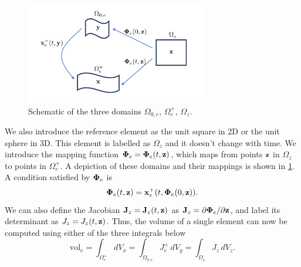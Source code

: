 \documentclass[11pt]{article}
\begin{document}
\begin{figure}[ht]
    \centering
    \includegraphics[width=0.7\textwidth]{../../images/three_spaces.pdf}
    \caption{Schematic of the three domains $\Omega_{0,e}$, $\Omega^+_e$, $\Omega_z$.}
    \label{fig:three_spaces}
 \end{figure}
We also introduce the reference element as the unit square in 2D or the unit sphere in 3D. This element is labelled as $\Omega_z$ and it doesn't change with time. We introduce the mapping function $\bm \Phi_e = \bm \Phi_e(t,\mathbf{z})$, which maps from points $\mathbf{z}$ in $\Omega_z$ to points in $\Omega^+_e$. A depiction of these domains and their mappings is shown in \cref{fig:three_spaces}. A condition satisfied by $\bm \Phi_e$ is
\begin{equation}
    \bm \Phi_e(t,\mathbf{z}) = \mathbf{x}^+_e(t, \bm \Phi_e(0,\mathbf{z})).
\end{equation}
We can also define the Jacobian $\mathbf{J}_z = \mathbf{J}_z(t,\mathbf{z})$ as $\mathbf{J}_z = \partial \bm \Phi_e / \partial \mathbf{z}$, and label its determinant as $J_z = J_z(t,\mathbf{z})$. Thus, the volume of a single element can now be computed using either of the three integrals below
\begin{equation}
    \text{vol}_e = \int_{\Omega^+_e} dV_x = \int_{\Omega_{0,e}} J^+_e \, dV_y = \int_{\Omega_z} J_z \, dV_z.
\end{equation}
\end{document}
